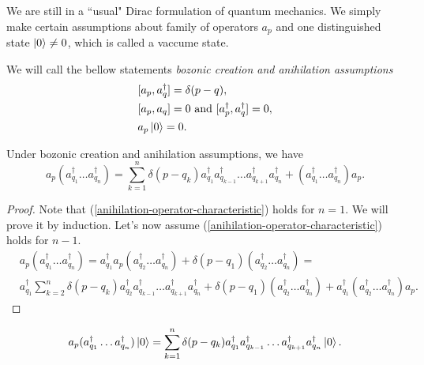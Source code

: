 \documentclass[main.tex]{subfiles}
\begin{document}
We are still in a ``usual" Dirac formulation of quantum mechanics. We simply make certain assumptions about family of operators $a_p$ and one distinguished state    $\ket{0} \not= 0$, which is called a vaccume state.

\begin{definition}
We will call the bellow statements \textit{bozonic creation and anihilation assumptions}
\begin{align}
& [a_p, a^\dagger_q] = \delta(p - q),\\
& [a_p, a_q] = 0 \text{ and } [a^\dagger_p, a^\dagger_q] = 0,\\
& a_p\ket{0} = 0.
\end{align}
\end{definition}

\begin{proposition}
Under bozonic creation and anihilation assumptions, we have
\begin{equation}
\label{anihilation-operator-characteristic}
a_p (a_{q_1}^\dagger \dots a_{q_n}^\dagger) = \sum_{k=1}^n\delta(p - q_k) a_{q_1}^\dagger a_{q_{k - 1}}^\dagger \dots a_{q_{k + 1}}^\dagger a_{q_n}^\dagger + (a_{q_1}^\dagger \dots a_{q_n}^\dagger)a_p.
\end{equation}
\end{proposition}
\begin{proof}
Note that (\ref{anihilation-operator-characteristic}) holds for $n = 1$. We will prove it by induction. Let's now assume (\ref{anihilation-operator-characteristic}) holds for $n - 1$.
\begin{align*}
& a_p (a_{q_1}^\dagger \dots a_{q_n}^\dagger)=
a_{q_1}^\dagger a_p (a_{q_2}^\dagger \dots a_{q_n}^\dagger) + \delta(p - q_1) (a_{q_2}^\dagger \dots a_{q_n}^\dagger)= \\
& a_{q_1}^\dagger\sum_{k=2}^n\delta(p - q_k) a_{q_2}^\dagger a_{q_{k - 1}}^\dagger \dots a_{q_{k + 1}}^\dagger a_{q_n}^\dagger + \delta(p - q_1) (a_{q_2}^\dagger \dots a_{q_n}^\dagger) + a_{q_1}^\dagger (a_{q_2}^\dagger \dots a_{q_n}^\dagger)a_p.
\end{align*} 
\end{proof}

\begin{corollary}
\begin{equation}
a_p (a_{q_1}^\dagger \dots a_{q_n}^\dagger) \ket{0} = \sum_{k=1}^n\delta(p - q_k) a_{q_1}^\dagger a_{q_{k - 1}}^\dagger \dots a_{q_{k + 1}}^\dagger a_{q_n}^\dagger \ket{0}.
\end{equation}
\end{corollary}
\end{document}
